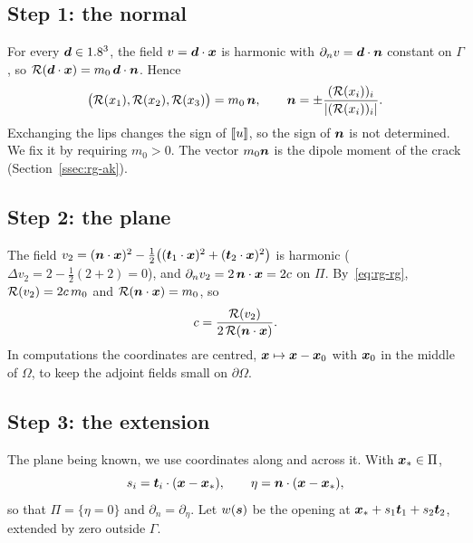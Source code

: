\subsection{Step 1: the normal}
For every $\bm{d}\in1.8^3$, the field $v=\bm{d}\cdot\bm{x}$ is harmonic with $\partial_nv=\bm{d}\cdot\bm{n}$ constant on $\Gamma$, so $\mathcal{R}(\bm{d}\cdot\bm{x})=m_0\,\bm{d}\cdot\bm{n}$. Hence
\begin{equation}\label{eq:rg-step1}
\bigl(\mathcal{R}(x_1),\mathcal{R}(x_2),\mathcal{R}(x_3)\bigr)=m_0\,\bm{n},\qquad
\bm{n}=\pm\frac{(\mathcal{R}(x_i))_i}{|(\mathcal{R}(x_i))_i|} .
\end{equation}
Exchanging the lips changes the sign of $[\![u]\!]$, so the sign of $\bm{n}$ is not determined. We fix it by requiring $m_0>0$. The vector $m_0\bm{n}$ is the dipole moment of the crack (Section~\ref{ssec:rg-ak}).

\subsection{Step 2: the plane}
The field $v_2=(\bm{n}\cdot\bm{x})^2-\tfrac12\bigl((\bm{t}_1\cdot\bm{x})^2+(\bm{t}_2\cdot\bm{x})^2\bigr)$ is harmonic ($\Delta v_2=2-\tfrac12(2+2)=0$), and $\partial_nv_2=2\,\bm{n}\cdot\bm{x}=2c$ on $\Pi$. By~\eqref{eq:rg-rg}, $\mathcal{R}(v_2)=2c\,m_0$ and $\mathcal{R}(\bm{n}\cdot\bm{x})=m_0$, so
\begin{equation}\label{eq:rg-step2}
c=\frac{\mathcal{R}(v_2)}{2\,\mathcal{R}(\bm{n}\cdot\bm{x})} .
\end{equation}
In computations the coordinates are centred, $\bm{x}\mapsto\bm{x}-\bm{x}_0$ with $\bm{x}_0$ in the middle of $\Omega$, to keep the adjoint fields small on $\partial\Omega$.

\subsection{Step 3: the extension}\label{ssec:rg-step3}
%
The plane being known, we use coordinates along and across it. With $\bm{x}_*\in\Pi$,
\[
s_i=\bm{t}_i\cdot(\bm{x}-\bm{x}_*),\qquad \eta=\bm{n}\cdot(\bm{x}-\bm{x}_*),
\]
so that $\Pi=\{\eta=0\}$ and $\partial_n=\partial_\eta$. Let $w(\bm{s})$ be the opening at $\bm{x}_*+s_1\bm{t}_1+s_2\bm{t}_2$, extended by zero outside $\Gamma$.

